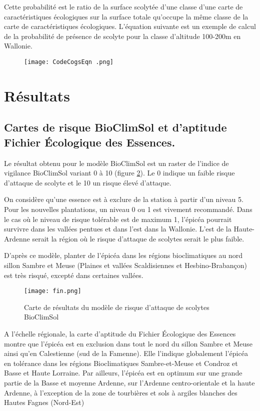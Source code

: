 Cette probabilité est le ratio de la surface scolytée d'une classe d'une carte de caractéristiques écologiques sur la surface totale qu'occupe la même classe de la carte de caractéristiques écologiques.
L'équation suivante est un exemple de calcul de la probabilité de présence de scolyte pour la classe d'altitude 100-200m en Wallonie.

\begin{figure} [htbp] 
    \centering
    \texttt{[image: CodeCogsEqn .png]}
   
    \label{fig:eq}
\end{figure}

\section{Résultats}

\subsection{Cartes de risque BioClimSol et d'aptitude Fichier Écologique des Essences.}
Le résultat obtenu pour le modèle BioClimSol est un raster de l'indice de vigilance BioClimSol variant 0 à 10 (figure \ref{fig:fin}). Le 0 indique un faible risque d’attaque de scolyte et le 10 un risque élevé d’attaque.


On considère qu'une essence est à exclure de la station à partir d'un niveau 5. Pour les nouvelles plantations, un niveau 0 ou 1 est vivement recommandé.  
Dans le cas où le niveau de risque tolérable est de maximum 1, l’épicéa pourrait survivre dans les vallées pentues et dans l’est dans la Wallonie. L'est de la Haute-Ardenne serait la région où le risque d'attaque de scolytes serait le plus faible.

D'après ce modèle, planter de l'épicéa dans les régions bioclimatiques au nord sillon Sambre et Meuse (Plaines et vallées Scaldisiennes et Hesbino-Brabançon) est très risqué, excepté dans certaines vallées.

\begin{figure} [htbp] 
	\centering
	\texttt{[image: fin.png]}
	\caption{Carte de résultats du modèle de risque d'attaque de scolytes BioClimSol}
	\label{fig:fin}
\end{figure}


A l'échelle régionale, la carte d'aptitude du Fichier Écologique des Essences montre que l'épicéa est en exclusion dans tout le nord du sillon Sambre et Meuse ainsi qu'en Calestienne (sud de la Famenne). Elle l'indique globalement l'épicéa en tolérance dans les régions Bioclimatiques Sambre-et-Meuse et Condroz et Basse et Haute Lorraine.
Par ailleurs, l'épicéa est en optimum sur une grande partie de la Basse et moyenne Ardenne, sur l'Ardenne centro-orientale et la haute Ardenne, à l'exception de la zone de tourbières et sols à argiles blanches des Hautes Fagnes (Nord-Est)



